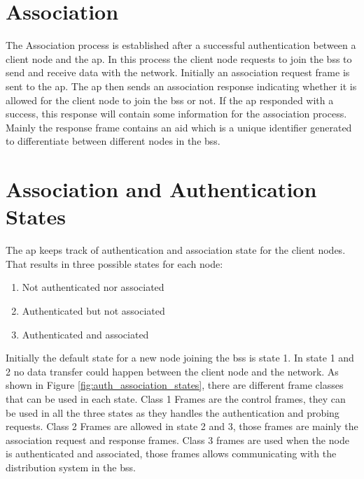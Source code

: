 \section{Association}
\label{sec:association}
The Association process is established after a successful authentication between a client node and the \ac{ap}.
In this process the client node requests to join the \ac{bss} to send and receive data with the network. Initially
an association request frame is sent to the \ac{ap}. The \ac{ap} then sends an association response indicating whether
it is allowed for the client node to join the \ac{bss} or not. If the \ac{ap} responded with a success, this response
will contain some information for the association process. Mainly the response frame contains an \ac{aid} which is a unique
identifier generated to differentiate between different nodes in the \ac{bss}.\cite{cwsp-205_2016}


\section{Association and Authentication States}
\label{sec:association_authentication_states}
The \ac{ap} keeps track of authentication and association state for the client nodes. That results in three
possible states for each node:
\begin{enumerate}
  \item Not authenticated nor associated
  \item Authenticated but not associated
  \item Authenticated and associated
\end{enumerate}

\newParagraph
Initially the default state for a new node joining the \ac{bss} is state 1. In state 1 and 2 no data transfer could
happen between the client node and the network. As shown in Figure \ref{fig:auth_association_states},
there are different frame classes that can be used in each state. Class 1 Frames are the control frames, they can be used
in all the three states as they handles the authentication and probing requests. Class 2 Frames are allowed in state 2 and 3,
those frames are mainly the association request and response frames. Class 3 frames are used when the node is authenticated
and associated, those frames allows communicating with the distribution system in the \ac{bss}.\cite{gast_2005}


